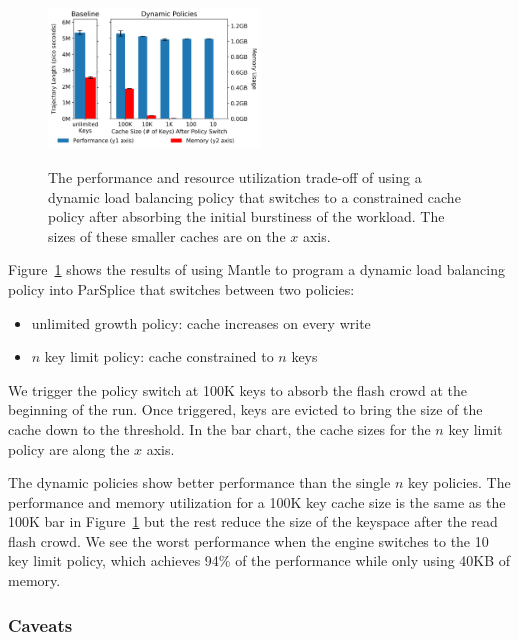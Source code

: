 \begin{figure}[t]
  \noindent\includegraphics[width=0.5\textwidth]{figures/methodology-tradeoff-dynamic.png}\\
  \caption{The performance and resource utilization trade-off of using a
  dynamic load balancing policy that switches to a constrained cache policy after absorbing
  the initial burstiness of the workload. The sizes of these smaller caches are
  on the \(x\) axis.  \label{fig:methodology-tradeoff-dynamic}}
\end{figure}

Figure~\ref{fig:methodology-tradeoff-dynamic} shows the results of using Mantle
to program a dynamic load balancing policy into ParSplice that switches between
two policies:

\begin{itemize}
  \item unlimited growth policy: cache increases on every write
  \item \(n\) key limit policy: cache constrained to \(n\) keys
\end{itemize}

We trigger the policy switch at 100K keys to absorb the flash crowd at the
beginning of the run. Once triggered, keys are evicted to bring the size of the
cache down to the threshold.  In the bar chart, the cache sizes for the \(n\)
key limit policy are along the \(x\) axis.

The dynamic policies show better performance than the single \(n\) key
policies. The performance and memory utilization for a 100K key cache size is
the same as the 100K bar in Figure~\ref{fig:methodology-tradeoff-dynamic} but
the rest reduce the size of the keyspace after the read flash crowd.  We see
the worst performance when the engine switches to the 10 key limit policy,
which achieves 94\% of the performance while only using 40KB of memory. 

\subsubsection*{Caveats}

